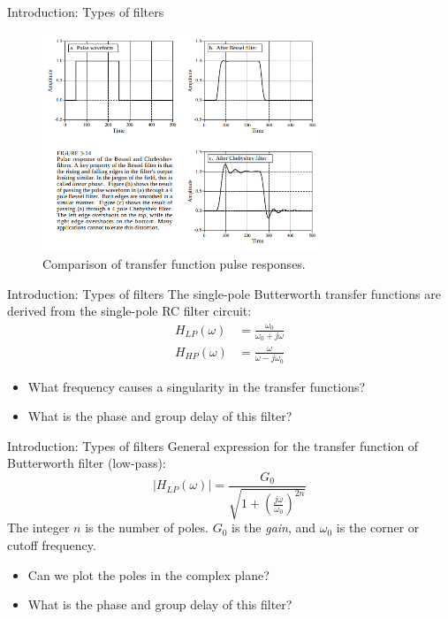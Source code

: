 \documentclass{beamer}
\begin{document}
\begin{frame}{Introduction: Types of filters}
\begin{figure}
\centering
\includegraphics[width=0.75\textwidth]{figures/filters3.png}
\caption{\label{fig:filters3} Comparison of transfer function pulse responses.}
\end{figure}
\end{frame}

\begin{frame}{Introduction: Types of filters}
\small
The single-pole Butterworth transfer functions are derived from the single-pole RC filter circuit:
\begin{align}
H_{LP}(\omega) &= \frac{\omega_0}{\omega_0+j\omega} \\
H_{HP}(\omega) &= \frac{\omega}{\omega-j\omega_0}
\end{align}
\begin{itemize}
\item What frequency causes a singularity in the transfer functions?
\item What is the phase and group delay of this filter?
\end{itemize}
\end{frame}

\begin{frame}{Introduction: Types of filters}
\small
General expression for the transfer function of Butterworth filter (low-pass):
\begin{equation}
|H_{LP}(\omega)| = \frac{G_0}{\sqrt{1+\left(\frac{j\omega}{\omega_0}\right)^{2n}}} \label{eq:butter}
\end{equation}
The integer $n$ is the number of poles. $G_0$ is the \textit{gain}, and $\omega_0$ is the corner or cutoff frequency.
\begin{itemize}
\item Can we plot the poles in the complex plane?
\item What is the phase and group delay of this filter?
\end{itemize}
\end{frame}
\end{document}
